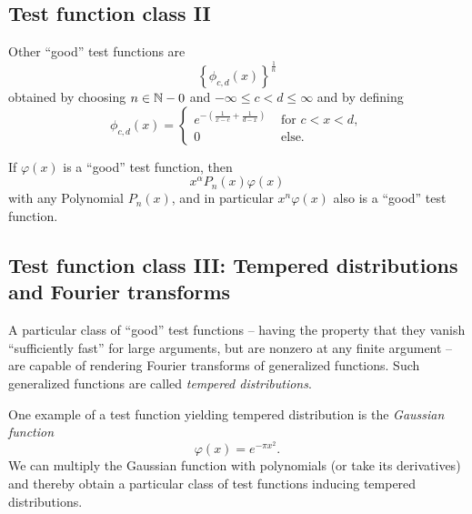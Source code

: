 \subsection{Test function class II}

Other ``good'' test functions are \cite{schwartz}
\begin{equation}
\left\{\phi_{c,d}(x)\right\}^\frac{1}{n}
\end{equation}
obtained by choosing $n\in {\Bbb N} - 0$
and $-\infty \le c<d\le \infty$ and by defining
\begin{equation}
\phi_{c,d}(x)
=
\begin{cases}
e^{-\left( \frac{1}{x-c} + \frac{1}{d-x} \right)} & \textrm{ for }  c<x<d ,   \\
                                                0 & \textrm{ else.}
\end{cases}
\end{equation}

If $\varphi (x)$ is a ``good'' test function, then
\begin{equation}
x^\alpha P_n (x)\varphi (x)
\end{equation}
with any Polynomial $P_n (x)$, and in particular $x^n\varphi (x)  $ also is
 a ``good'' test function.

\subsection{Test function class III: Tempered distributions and Fourier transforms}

A particular class of ``good'' test functions -- having the property that they vanish
``sufficiently fast'' for large arguments, but are nonzero at any finite argument --
are capable of rendering Fourier transforms of generalized functions. Such generalized functions are called
{\em tempered distributions}.

One example of a test function yielding tempered distribution is the {\em Gaussian function}
\begin{equation}
\varphi (x)= e^{-\pi x^2}.
\label{2012-m-ch-di-td}
\end{equation}
We can multiply the Gaussian function with polynomials (or take its derivatives) and thereby obtain a particular class of test functions
inducing tempered distributions.


